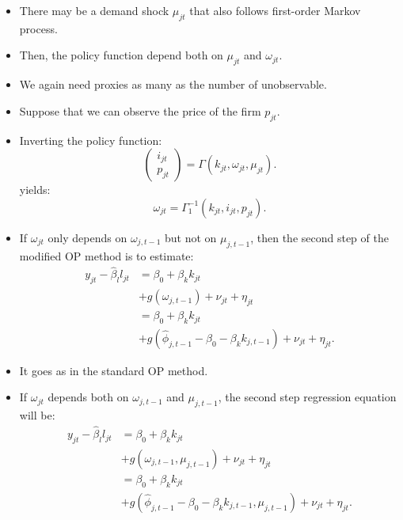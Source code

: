 \documentclass[
]{book}
\providecommand{\tightlist}{%
  \setlength{\itemsep}{0pt}\setlength{\parskip}{0pt}}
\begin{document}
\begin{itemize}
\tightlist
\item
  There may be a demand shock \(\mu_{jt}\) that also follows first-order Markov process.
\item
  Then, the policy function depend both on \(\mu_{jt}\) and \(\omega_{jt}\).
\item
  We again need proxies as many as the number of unobservable.
\item
  Suppose that we can observe the price of the firm \(p_{jt}\).
\item
  Inverting the policy function:
  \begin{equation}
  \begin{pmatrix}
  i_{jt}\\ p_{jt}
  \end{pmatrix}
  = \Gamma(k_{jt}, \omega_{jt}, \mu_{jt}).
  \end{equation}
  yields:
  \begin{equation}
  \omega_{jt} = \Gamma_1^{- 1}(k_{jt}, i_{jt}, p_{jt}).
  \end{equation}
\item
  If \(\omega_{jt}\) only depends on \(\omega_{j, t - 1}\) but not on \(\mu_{j, t - 1}\), then the second step of the modified OP method is to estimate:
  \begin{equation}
  \begin{split}
  y_{jt} - \hat{\beta}_l l_{jt} 
  &= \beta_0 + \beta_k k_{jt}\\
  & + g(\omega_{j, t - 1}) + \nu_{jt} + \eta_{jt}\\
  &= \beta_0 + \beta_k k_{jt}\\
  & + g(\hat{\phi}_{j, t - 1} - \beta_0 - \beta_k k_{j, t - 1}) + \nu_{jt} + \eta_{jt}.
  \end{split}
  \end{equation}
\item
  It goes as in the standard OP method.
\item
  If \(\omega_{jt}\) depends both on \(\omega_{j, t - 1}\) and \(\mu_{j, t - 1}\), the second step regression equation will be:
  \begin{equation}
  \begin{split}
  y_{jt} - \hat{\beta}_l l_{jt} 
  &= \beta_0 + \beta_k k_{jt}\\
  & + g(\omega_{j, t - 1}, \mu_{j, t - 1}) + \nu_{jt} + \eta_{jt}\\
  &= \beta_0 + \beta_k k_{jt}\\
  & + g(\hat{\phi}_{j, t - 1} - \beta_0 - \beta_k k_{j, t - 1}, \mu_{j, t - 1}) + \nu_{jt} + \eta_{jt}.

\end{split}
\end{equation}
\end{itemize}
\end{document}
